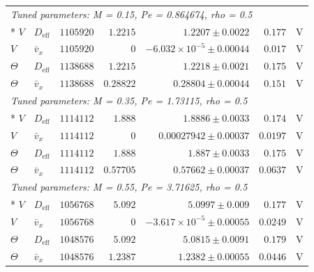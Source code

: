 \begin{longtable}{llrrrrc}
\multicolumn{7}{l}{\textit{Tuned parameters: M = 0.15, Pe = 0.864674, rho = 0.5}} \\*
$V$ & $D_{\mathrm{eff}}$ & $1105920$ & $1.2215$ & $1.2207 \pm 0.0022$ & $0.177$ & V \\
$V$ & $\bar v_x$ & $1105920$ & $0$ & $-6.032\times10^{-5} \pm 0.00044$ & $0.017$ & V \\
$\Theta$ & $D_{\mathrm{eff}}$ & $1138688$ & $1.2215$ & $1.2218 \pm 0.0021$ & $0.175$ & V \\
$\Theta$ & $\bar v_x$ & $1138688$ & $0.28822$ & $0.28804 \pm 0.00044$ & $0.151$ & V \\
\multicolumn{7}{l}{\textit{Tuned parameters: M = 0.35, Pe = 1.73115, rho = 0.5}} \\*
$V$ & $D_{\mathrm{eff}}$ & $1114112$ & $1.888$ & $1.8886 \pm 0.0033$ & $0.174$ & V \\
$V$ & $\bar v_x$ & $1114112$ & $0$ & $0.00027942 \pm 0.00037$ & $0.0197$ & V \\
$\Theta$ & $D_{\mathrm{eff}}$ & $1114112$ & $1.888$ & $1.887 \pm 0.0033$ & $0.175$ & V \\
$\Theta$ & $\bar v_x$ & $1114112$ & $0.57705$ & $0.57662 \pm 0.00037$ & $0.0637$ & V \\
\multicolumn{7}{l}{\textit{Tuned parameters: M = 0.55, Pe = 3.71625, rho = 0.5}} \\*
$V$ & $D_{\mathrm{eff}}$ & $1056768$ & $5.092$ & $5.0997 \pm 0.009$ & $0.177$ & V \\
$V$ & $\bar v_x$ & $1056768$ & $0$ & $-3.617\times10^{-5} \pm 0.00055$ & $0.0249$ & V \\
$\Theta$ & $D_{\mathrm{eff}}$ & $1048576$ & $5.092$ & $5.0815 \pm 0.0091$ & $0.179$ & V \\
$\Theta$ & $\bar v_x$ & $1048576$ & $1.2387$ & $1.2382 \pm 0.00055$ & $0.0446$ & V \\
\hline
\end{longtable}
\endgroup
